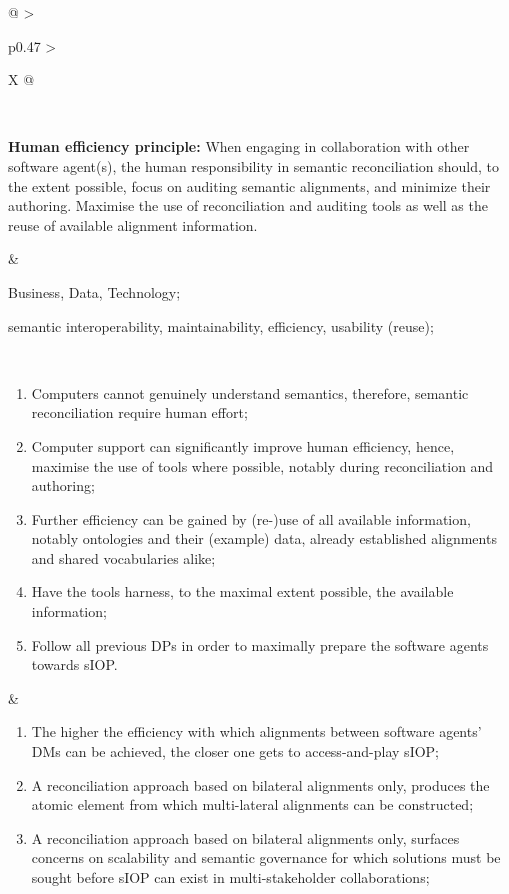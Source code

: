 \begin{xltabular}[l]{\linewidth}{@{} >{\small\raggedright\arraybackslash}p{0.47\linewidth} >{\small\raggedright\arraybackslash}X @{}}
\begin{enumerate}[left=10pt, nosep]
\end{enumerate} \\
%
%
%
\begin{mmdp}\label{dp:he}{\bfseries Human efficiency principle:}
\quad When engaging in collaboration with other software agent(s), the human responsibility in semantic reconciliation should, to the extent possible, focus on auditing semantic alignments, and minimize their authoring. Maximise the use of reconciliation and auditing tools as well as the reuse of available alignment information.\end{mmdp}
&
\begin{description}[labelwidth=3.7cm,leftmargin=3.7cm+1ex,nosep,topsep=2ex,labelsep=1ex,font=\bfseries]
\item[Type of information:] Business, Data, Technology;
\item[Quality attributes:] semantic interoperability, maintainability, efficiency, usability (reuse);
\end{description}
\\
\begin{enumerate}[left=6pt, nosep]
  \item Computers cannot genuinely understand semantics, therefore, semantic reconciliation require human effort;
  \item Computer support can significantly improve human efficiency, hence, maximise the use of tools where possible, notably during reconciliation and authoring;
  \item Further efficiency can be gained by (re-)use of all available information, notably ontologies and their (example) data, already established alignments and shared vocabularies alike;
  \item Have the tools harness, to the maximal extent possible, the available information;
  \item Follow all previous DPs in order to maximally prepare the software agents towards sIOP.
\end{enumerate}
&
\begin{enumerate}[left=10pt, nosep]
  \item The higher the efficiency with which alignments between software agents' DMs can be achieved, the closer one gets to access-and-play sIOP;
  \item A reconciliation approach based on bilateral alignments only, produces the atomic element from which multi-lateral alignments can be constructed;
  \item A reconciliation approach based on bilateral alignments only, surfaces concerns on scalability and semantic governance for which solutions must be sought before sIOP can exist in multi-stakeholder collaborations;

\end{enumerate}
\end{xltabular}
